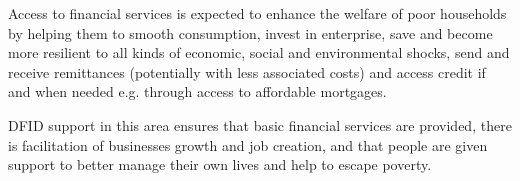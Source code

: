 Access to financial services is expected to enhance the welfare of poor households by helping them to
smooth consumption, invest in enterprise, save and become more resilient to all kinds of economic, social
and environmental shocks, send and receive remittances (potentially with less associated costs) and
access credit if and when needed e.g. through access to affordable mortgages. %

DFID support in this area ensures that basic financial services are provided, there is facilitation of businesses growth and job creation, and that people are given support to better manage their own lives and help to escape poverty. %

\newpage
